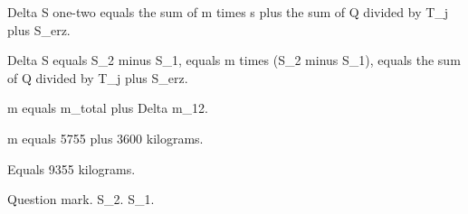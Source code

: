 Delta S one-two equals the sum of m times s plus the sum of Q divided by T_j plus S_erz.  

Delta S equals S_2 minus S_1, equals m times (S_2 minus S_1), equals the sum of Q divided by T_j plus S_erz.  

m equals m_total plus Delta m_12.  

m equals 5755 plus 3600 kilograms.  

Equals 9355 kilograms.  

Question mark.  
S_2.  
S_1.